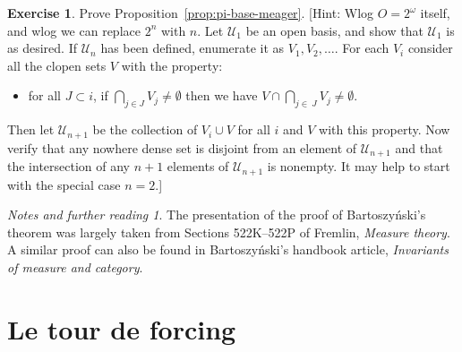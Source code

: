 \documentclass[11pt,oneside,a4paper]{amsbook}
\theoremstyle{definition}
\newtheorem{exercise}{Exercise}[section]
\theoremstyle{plain}
\theoremstyle{definition}
\theoremstyle{remark}
\newtheorem*{notes}{Notes and further reading}
\numberwithin{equation}{section}
\numberwithin{figure}{section}
\begin{document}
\begin{exercise}
  \label{exerc:pi-base-meager}
  Prove Proposition~\ref{prop:pi-base-meager}. [Hint: Wlog $O=2^\omega$ itself, and wlog we can replace $2^n$ with $n$. Let $\mathcal U_1$ be an open basis, and show that $\mathcal U_1$ is as desired. If $\mathcal U_n$ has been defined, enumerate it as $V_1,V_2,\ldots$. For each $V_i$ consider all the clopen sets $V$ with the property:
  \begin{itemize}
  \item for all $J\subset i$, if $\bigcap_{j\in J}V_j\neq\emptyset$ then we have $V\cap\bigcap_{j\in\ J}V_j\neq\emptyset$.
  \end{itemize}
  Then let $\mathcal U_{n+1}$ be the collection of $V_i\cup V$ for all $i$ and $V$ with this property. Now verify that any nowhere dense set is disjoint from an element of $\mathcal U_{n+1}$ and that the intersection of any $n+1$ elements of $\mathcal U_{n+1}$ is nonempty. It may help to start with the special case $n=2$.]
\end{exercise}

\begin{notes}
  The presentation of the proof of Bartoszy\'nski's theorem was largely taken from Sections 522K--522P of Fremlin, \emph{Measure theory}. A similar proof can also be found in Bartoszy\'nski's handbook article, \emph{Invariants of measure and category}.
\end{notes}


\chapter{Le tour de forcing}





\end{document}
